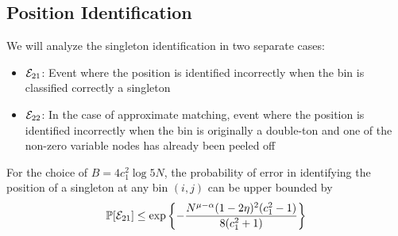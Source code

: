 \subsection{\bf Position Identification}
We will analyze the singleton identification in two separate cases:
\begin{itemize}
\item $\mathcal{E}_{21}$: Event where the position is identified incorrectly when the bin is classified  correctly a singleton
\item $\mathcal{E}_{22}$: In the case of approximate matching, event where the position is identified incorrectly when the bin is originally a double-ton and one of the non-zero variable nodes has already been peeled off
\end{itemize} 
\begin{lemma}
For the choice of $B=4c_1^2\log 5N$, the probability of error in identifying the position of a singleton at any bin $(i,j)$ can be upper bounded by
\begin{align*}
\mathbb{P}[\mathcal{E}_{21}]\leq \exp\left\lbrace-\frac{N^{\mu-\alpha}(1-2\eta)^2(c_1^2-1)}{8(c_1^2+1)}\right\rbrace
\end{align*}
\end{lemma}
